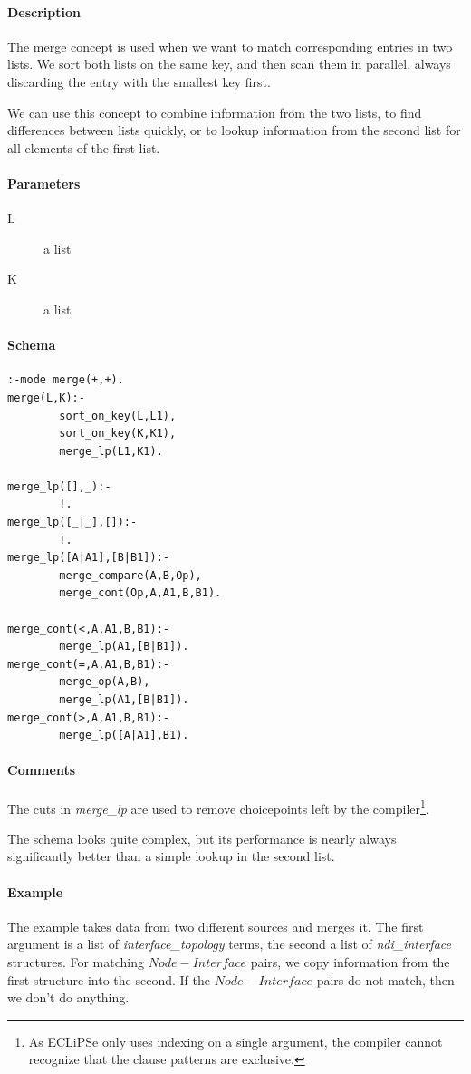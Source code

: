 \documentclass[a4paper,12pt]{report}
\begin{document}
\paragraph{Description}
The merge concept is used when we want to match corresponding entries in two lists. We sort both lists on the same key, and then scan them in parallel, always discarding the entry with the smallest key first.

We can use this concept to combine information from the two lists, to find differences between lists quickly, or to lookup information from the second list for all elements of the first list.
\paragraph{Parameters}
\begin{description}
\item[L] a list
\item[K] a list
\end{description}
\paragraph{Schema}
\begin{verbatim}
:-mode merge(+,+).
merge(L,K):-
        sort_on_key(L,L1),
        sort_on_key(K,K1),
        merge_lp(L1,K1).

merge_lp([],_):-
        !.
merge_lp([_|_],[]):-
        !.
merge_lp([A|A1],[B|B1]):-
        merge_compare(A,B,Op),
        merge_cont(Op,A,A1,B,B1).

merge_cont(<,A,A1,B,B1):-
        merge_lp(A1,[B|B1]).
merge_cont(=,A,A1,B,B1):-
        merge_op(A,B),
        merge_lp(A1,[B|B1]).
merge_cont(>,A,A1,B,B1):-
        merge_lp([A|A1],B1).
\end{verbatim}
\paragraph{Comments}
The cuts in {\it merge\_lp} are used to remove choicepoints left by the compiler\footnote{As ECLiPSe only uses indexing on a single argument, the compiler cannot recognize that the clause patterns are exclusive.}.

The schema looks quite complex, but its performance is nearly always significantly better than a simple lookup in the second list.
\pagebreak
\paragraph{Example}
The example takes data from two different sources and merges it. The first argument is a list of {\it interface\_topology} terms, the second a list of {\it ndi\_interface} structures. For matching $Node-Interface$ pairs, we copy information from the first structure into the second. If the $Node-Interface$ pairs do not match, then we don't do anything.
\end{document}
